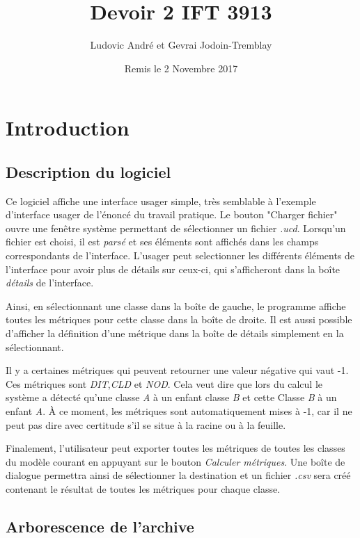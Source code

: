 \documentclass[letter,french]{report}
\begin{document}
	\title{Devoir 2 IFT 3913}
	\author{Ludovic André et Gevrai Jodoin-Tremblay}
	\date{Remis le 2 Novembre 2017}
	\maketitle
	
	
  \section*{Introduction}

	\subsection*{Description du logiciel}
	Ce logiciel affiche une interface usager simple, très semblable
	à l'exemple d'interface usager de l'énoncé du travail pratique. Le bouton "Charger
	fichier" ouvre une fenêtre système permettant de sélectionner un fichier \emph{.ucd}.
	Lorsqu'un fichier est choisi, il est \emph{parsé} et ses éléments sont affichés dans
	les champs correspondants de l'interface. L'usager peut selectionner les
  différents éléments de l'interface pour avoir plus de détails sur ceux-ci, qui
  s'afficheront dans la boîte \emph{détails} de l'interface.

  Ainsi, en sélectionnant une classe dans la boîte de gauche, le programme
  affiche toutes les métriques pour cette classe dans la boîte de droite. Il est
  aussi possible d'afficher la définition d'une métrique dans la boîte de
  détails simplement en la sélectionnant.
  
  Il y a certaines métriques qui peuvent retourner une valeur négative qui vaut
  -1. Ces métriques sont \emph{DIT},\emph{CLD} et \emph{NOD}. Cela veut dire que lors du
  calcul le système a détecté qu'une classe \emph{A} à un enfant classe \emph{B} et cette
  Classe \emph{B} à un enfant \emph{A}. À ce moment, les métriques sont automatiquement
  mises à -1, car il ne peut pas dire avec certitude s’il se situe à la racine
  ou à la feuille.

  Finalement, l'utilisateur peut exporter toutes les métriques de toutes les
  classes du modèle courant en
  appuyant sur le bouton \emph{Calculer métriques}. Une boîte de dialogue
  permettra ainsi de sélectionner la destination et un fichier \emph{.csv} sera
  créé contenant le résultat de toutes les métriques pour chaque classe.

  \subsection*{Arborescence de l'archive}
\end{document}
